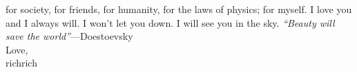 \documentclass[12pt]{article}
\theoremstyle{definition} %
\theoremstyle{plain} %
\begin{document}
for society, for friends, for humanity, for the laws of physics; for myself. I love you and I always will. I won’t let you down. I will see you in the sky. \emph{“Beauty will save the world”}—Doestoevsky
\\
\vspace{.5cm} 
Love, 
\\
\vspace{.5cm} 
richrich
\end{document}
